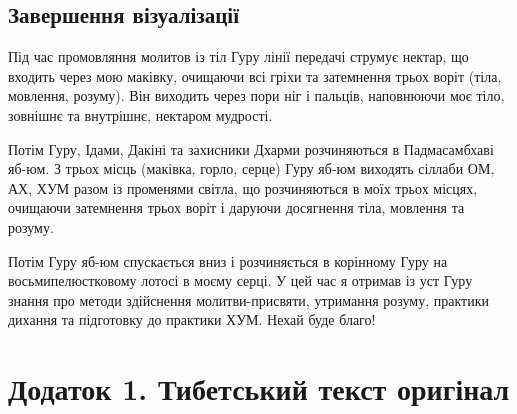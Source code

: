 \documentclass{article}
\begin{document}
\subsection{Завершення візуалізації}

Під час промовляння молитов із тіл Гуру лінії передачі струмує нектар, що
входить через мою маківку, очищаючи всі гріхи та затемнення трьох воріт
(тіла, мовлення, розуму). Він виходить через пори ніг і пальців, наповнюючи
моє тіло, зовнішнє та внутрішнє, нектаром мудрості.

Потім Гуру, Ідами, Дакіні та захисники Дхарми розчиняються в Падмасамбхаві
яб-юм. З трьох місць (маківка, горло, серце) Гуру яб-юм виходять сіллаби
ОМ, АХ, ХУМ разом із променями світла, що розчиняються в моїх трьох місцях,
очищаючи затемнення трьох воріт і даруючи досягнення тіла, мовлення та розуму.

Потім Гуру яб-юм спускається вниз і розчиняється в корінному Гуру на
восьмипелюстковому лотосі в моєму серці. У цей час я отримав із уст Гуру
знання про методи здійснення молитви-присвяти, утримання розуму,
практики дихання та підготовку до практики ХУМ. Нехай буде благо!

\section{Додаток 1. Тибетський текст оригінал}
\end{document}
